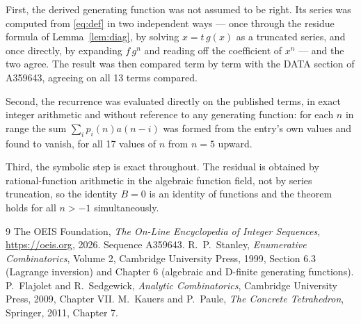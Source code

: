 \documentclass[11pt,a4paper]{article}
\theoremstyle{plain}
\theoremstyle{definition}
\begin{document}
First, the derived generating function was not assumed to be right. Its series was
computed from \eqref{eq:def} in two independent ways --- once through the residue formula
of Lemma~\ref{lem:diag}, by solving $x=t\,g(x)$ as a truncated series, and once directly,
by expanding $f\,g^{n}$ and reading off the coefficient of $x^{n}$ --- and the two agree.
The result was then compared term by term with the DATA section of A359643, agreeing on
all 13 terms compared.

Second, the recurrence was evaluated directly on the published terms, in exact integer
arithmetic and without reference to any generating function: for each $n$ in range the sum
$\sum_{i}p_{i}(n)a(n-i)$ was formed from the entry's own values and found to vanish, for
all 17 values of $n$ from $n=5$ upward.

Third, the symbolic step is exact throughout. The residual is obtained by
rational-function arithmetic in the algebraic function field, not by series truncation, so
the identity $B=0$ is an identity of functions and the theorem holds for all
$n>-1$ simultaneously.

\begin{thebibliography}{9}
 The OEIS Foundation, \emph{The On-Line Encyclopedia of Integer Sequences},
\url{https://oeis.org}, 2026. Sequence A359643.
 R.~P.~Stanley, \emph{Enumerative Combinatorics}, Volume 2, Cambridge
University Press, 1999, Section 6.3 (Lagrange inversion) and Chapter 6 (algebraic and
D-finite generating functions).
 P.~Flajolet and R.~Sedgewick, \emph{Analytic Combinatorics}, Cambridge
University Press, 2009, Chapter VII.
 M.~Kauers and P.~Paule, \emph{The Concrete Tetrahedron}, Springer, 2011,
Chapter 7.
\end{thebibliography}
\end{document}
